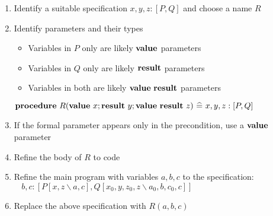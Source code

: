 \begin{itemize}
\begin{itemize}
\begin{enumerate}
			\item Identify a suitable specification $ x, y, z : [P, Q] $ and choose a name $ R $
			
			\item Identify parameters and their types
			
			\begin{itemize}
				
				\item Variables in $ P $ only are likely $ {\bf value} $ parameters
				
				\item Variables in $ Q $ only are likely $ {\bf result} $ parameters
				
				\item Variables in both are likely $ {\bf value} ~ {\bf result} $ parameters
				
			\end{itemize}
		
			$ {\bf procedure} ~ R({\bf value} ~ x; {\bf result} ~ y; {\bf value} ~ {\bf result} ~ z) ~ \widehat{=} ~ x, y, z : [P, Q] $
			
			\item If the formal parameter appears only in the precondition, use a $ {\bf value} $ parameter
			
			\item Refine the body of $ R $ to code
			
			\item Refine the main program with variables $ a, b, c $ to the specification:\\
			$ ~~~~ b, c : [P[x, z \backslash a, c], Q[x_0, y, z_0, z \backslash a_0, b, c_0, c]]$
			
			\item Replace the above specification with $ R(a, b, c) $
			
		\end{enumerate}
		
	\end{itemize}
	
\end{itemize}